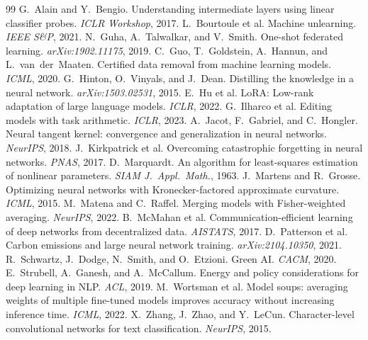 \documentclass[11pt]{article}
\begin{document}
\begin{thebibliography}{99}
 G.~Alain and Y.~Bengio.
Understanding intermediate layers using linear classifier probes.
\emph{ICLR Workshop}, 2017.
 L.~Bourtoule et al.
Machine unlearning. \emph{IEEE S\&P}, 2021.
 N.~Guha, A.~Talwalkar, and
V.~Smith. One-shot federated learning. \emph{arXiv:1902.11175}, 2019.
 C.~Guo, T.~Goldstein, A.~Hannun, and
L.~van~der~Maaten. Certified data removal from machine learning models.
\emph{ICML}, 2020.
 G.~Hinton, O.~Vinyals, and
J.~Dean. Distilling the knowledge in a neural network.
\emph{arXiv:1503.02531}, 2015.
 E.~Hu et al. LoRA: Low-rank
adaptation of large language models. \emph{ICLR}, 2022.
 G.~Ilharco et al. Editing
models with task arithmetic. \emph{ICLR}, 2023.
 A.~Jacot, F.~Gabriel, and
C.~Hongler. Neural tangent kernel: convergence and generalization in
neural networks. \emph{NeurIPS}, 2018.
 J.~Kirkpatrick et
al. Overcoming catastrophic forgetting in neural networks.
\emph{PNAS}, 2017.
 D.~Marquardt. An algorithm for
least-squares estimation of nonlinear parameters. \emph{SIAM J.\ Appl.\
Math.}, 1963.
 J.~Martens and R.~Grosse.
Optimizing neural networks with Kronecker-factored approximate
curvature. \emph{ICML}, 2015.
 M.~Matena and C.~Raffel.
Merging models with Fisher-weighted averaging. \emph{NeurIPS}, 2022.
\bibitem[McMahan et al.(2017)]{mcmahan2017} B.~McMahan et al.
Communication-efficient learning of deep networks from decentralized
data. \emph{AISTATS}, 2017.
 D.~Patterson et al.
Carbon emissions and large neural network training.
\emph{arXiv:2104.10350}, 2021.
 R.~Schwartz, J.~Dodge,
N.~Smith, and O.~Etzioni. Green AI. \emph{CACM}, 2020.
 E.~Strubell, A.~Ganesh,
and A.~McCallum. Energy and policy considerations for deep learning in
NLP. \emph{ACL}, 2019.
 M.~Wortsman et al. Model
soups: averaging weights of multiple fine-tuned models improves accuracy
without increasing inference time. \emph{ICML}, 2022.
 X.~Zhang, J.~Zhao, and Y.~LeCun.
Character-level convolutional networks for text classification.
\emph{NeurIPS}, 2015.
\end{thebibliography}
\end{document}

